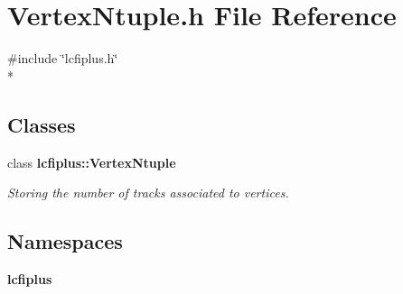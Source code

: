 \section{Vertex\-Ntuple.\-h File Reference}
\label{VertexNtuple_8h}
{\ttfamily \#include \char`\"{}lcfiplus.\-h\char`\"{}}\\*
\subsection*{Classes}
\begin{DoxyCompactItemize}
\item 
class {\bf lcfiplus\-::\-Vertex\-Ntuple}
\begin{DoxyCompactList}\small\item\em Storing the number of tracks associated to vertices. \end{DoxyCompactList}\end{DoxyCompactItemize}
\subsection*{Namespaces}
\begin{DoxyCompactItemize}
\item 
{\bf lcfiplus}
\end{DoxyCompactItemize}
